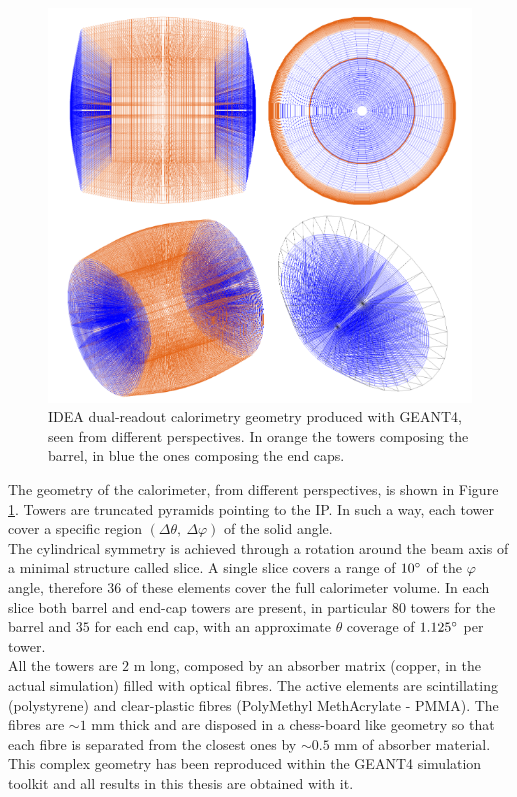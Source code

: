 \begin{figure}
	\centering
	\includegraphics[width=.9\textwidth]{IMG/Cap1/DRCal_geo.png}
	\caption{IDEA dual-readout calorimetry geometry produced with GEANT4, seen from different perspectives. In orange the towers composing the barrel, in blue the ones composing the end caps.}
	\label{fig:DRCal_geo}
\end{figure}

The geometry of the calorimeter, from different perspectives, is shown in Figure \ref{fig:DRCal_geo}. Towers are truncated pyramids pointing to the IP. In such a way, each tower cover a specific region $(\Delta \theta, ~\Delta\varphi)$ of the solid angle.\\
The cylindrical symmetry is achieved through a rotation around the beam axis of a minimal structure called slice. A single slice covers a range of $10\degree$ of the $\varphi$ angle, therefore $36$ of these elements cover the full calorimeter volume.
In each slice both barrel and end-cap towers are present, in particular $80$ towers for the barrel and $35$ for each end cap, with an approximate $\theta$ coverage of $1.125\degree$ per tower.\\
All the towers are $2$ m long, composed by an absorber matrix (copper, in the actual simulation) filled with optical fibres.
The active elements are scintillating (polystyrene) and clear-plastic fibres (PolyMethyl MethAcrylate - PMMA).
The fibres are $\sim 1$ mm thick and are disposed in a chess-board like geometry so that each fibre is separated from the closest ones by $\sim 0.5$ mm of absorber material.
This complex geometry has been reproduced within the GEANT4 simulation toolkit \cite{GEANT4} and all results in this thesis are obtained with it.

